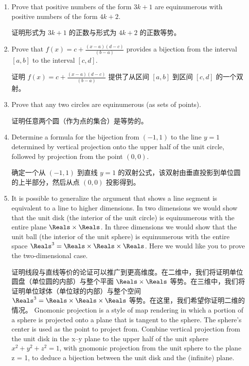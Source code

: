 \begin{enumerate}
    \item  Prove that positive numbers of the form $3k +1$ are equinumerous with
    positive numbers of the form $4k + 2$.
    
    证明形式为 $3k +1$ 的正数与形式为 $4k + 2$ 的正数等势。
    \wbvfill
    
    \item Prove that $\displaystyle f(x) =  c + \frac{(x-a)(d-c)}{(b-a)}$ 
    provides a bijection from the interval $[a, b]$ to the interval $[c, d]$.
    
    证明 $\displaystyle f(x) =  c + \frac{(x-a)(d-c)}{(b-a)}$ 提供了从区间 $[a, b]$ 到区间 $[c, d]$ 的一个双射。
    \wbvfill
    
    \workbookpagebreak
    
    \item Prove that any two circles are equinumerous (as sets of points).
    
    证明任意两个圆（作为点的集合）是等势的。
    \wbvfill
    
    \item Determine a formula for the bijection from $(-1, 1)$ to the line $y = 1$
    determined by vertical projection onto the upper half of the unit circle,
    followed by projection from the point $(0, 0)$.
    
    确定一个从 $(-1, 1)$ 到直线 $y = 1$ 的双射公式，该双射由垂直投影到单位圆的上半部分，然后从点 $(0, 0)$ 投影得到。
    \wbvfill
    
    \workbookpagebreak
    
    \item  It is possible to generalize the argument that shows a line segment is
    equivalent to a line to higher dimensions.
    In two dimensions we would
    show that the unit disk (the interior of the unit circle) is equinumerous
    with the entire plane $\Reals \times \Reals$.
    In three dimensions we would show that
    the unit ball (the interior of the unit sphere) is equinumerous with the
    entire space $\Reals^3 = \Reals \times \Reals \times \Reals$.
    Here we 
    would like you to prove the two-dimensional case.
    
    证明线段与直线等价的论证可以推广到更高维度。在二维中，我们将证明单位圆盘（单位圆的内部）与整个平面 $\Reals \times \Reals$ 等势。在三维中，我们将证明单位球体（单位球的内部）与整个空间 $\Reals^3 = \Reals \times \Reals \times \Reals$ 等势。在这里，我们希望你证明二维的情况。
    Gnomonic projection is a style of map rendering in which a portion of a
    sphere is projected onto a plane that is tangent to the sphere.
    The 
    sphere's center is used as the point to project from.
    Combine 
    vertical projection from the unit disk
    in the x--y plane to the upper half of the unit sphere $x^2 + y^2 + z^2 = 1$,
    with gnomonic projection from the unit sphere to the plane z = 1, to
    deduce a bijection between the unit disk and the (infinite) plane.
    

\end{enumerate}
